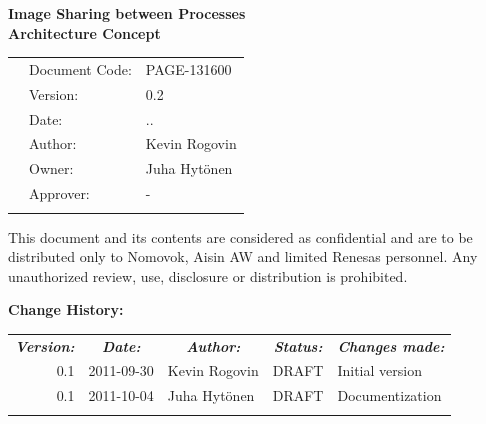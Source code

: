 \documentclass[a4paper,11pt]{article}
\renewcommand{\dateseparator}{.}
\newcommand{\todayiso}{\twodigit\day\dateseparator\twodigit\month\dateseparator\the\year}
\begin{document}
\begin{center}

\vspace*{105.5pt}
{\LARGE \bf Image Sharing between Processes}\\
{\LARGE \bf Architecture Concept}\\
\vspace{71pt}

{
\begin{tabular}{lll}
  &Document Code: & PAGE-131600 \\ 
  &Version: & 0.2 \\ 
  &Date: & \todayiso \\ 
  &Author: & Kevin Rogovin \\ 
  &Owner: & Juha Hytönen \\ 
  &Approver: & - \\
  \multicolumn{1}{p{3.83cm}}{} &
  \multicolumn{1}{p{4.17cm}}{} & 
  \multicolumn{1}{p{8.00cm}}{}\\
\end{tabular}
}

\small
This document and its contents are considered as confidential and are to be distributed only to Nomovok, Aisin AW and limited Renesas personnel. 
Any unauthorized review, use, disclosure or distribution is prohibited. 

\end{center}

\newpage

\noindent\textbf{Change History:}
\label{sec:changelog}
\begin{table}[h!tbp]
  \begin{tabular}{rllll}
    \multicolumn{1}{c}{\textbf{\textit{Version:}}}& 
    \multicolumn{1}{c}{\textbf{\textit{Date:}}} & 
    \multicolumn{1}{c}{\textbf{\textit{Author:}}} &
    \multicolumn{1}{c}{\textbf{\textit{Status:}}} &
    \multicolumn{1}{c}{\textbf{\textit{Changes made:}}}\\
    0.1 & 2011-09-30 & Kevin Rogovin & DRAFT & Initial version \\
    0.1 & 2011-10-04 & Juha Hytönen & DRAFT & Documentization \\
    \multicolumn{1}{p{1.8cm}}{}&
    \multicolumn{1}{p{2.18cm}}{}&
    \multicolumn{1}{p{3.42cm}}{}&
    \multicolumn{1}{p{2.31cm}}{}&
    \multicolumn{1}{p{6.2cm}}{}\\
  \end{tabular}
\end{table}
\end{document}
